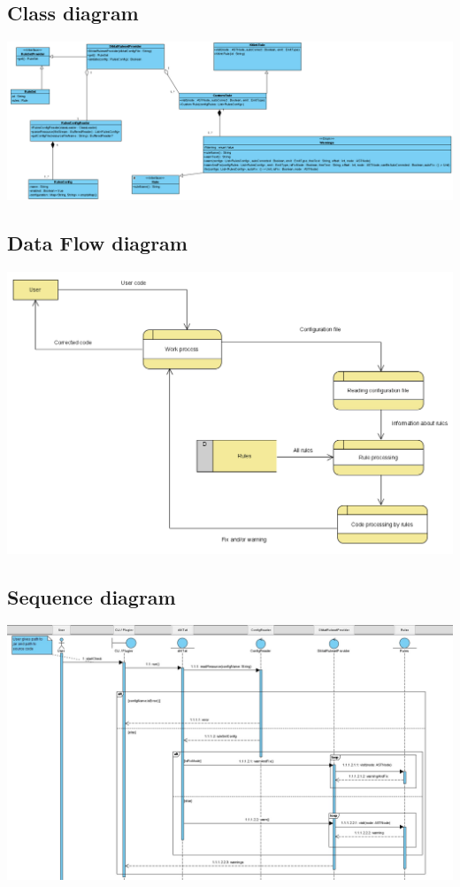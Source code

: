 \subsection{Class diagram}
  \includegraphics[scale=0.5]{pictures/class.PNG}

\subsection{Data Flow diagram}
  \includegraphics[scale=0.6]{pictures/data_flow.PNG}

\subsection{Sequence diagram}
  \includegraphics[scale=0.33]{pictures/sequence.jpg}

